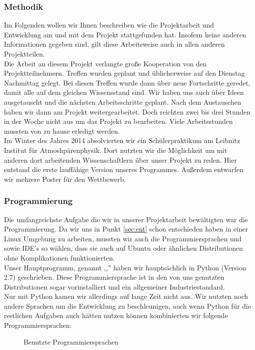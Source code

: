 \subsubsection{Methodik} %
Im Folgenden wollen wir Ihnen beschreiben wie die Projektarbeit und Entwicklung am und mit dem Projekt stattgefunden hat.
Insofern keine anderen Informationen gegeben sind, gilt diese Arbeitsweise auch in allen anderen Projektteilen. \\
Die Arbeit an diesem Projekt verlangte große Kooperation von den Projektteilnehmern.
Treffen wurden geplant und üblicherweise auf den Dienstag Nachmittag gelegt.
Bei diesen Treffen wurde dann über neue Fortschritte geredet, damit alle auf dem gleichen Wissensstand sind.
Wir haben uns auch über Ideen ausgetauscht und die nächsten Arbeitsschritte geplant.
Nach dem Austauschen haben wir dann am Projekt weitergearbeitet.
Doch reichten zwei bis drei Stunden in der Woche nicht aus um das Projekt zu bearbeiten.
Viele Arbeitsstunden mussten von zu hause erledigt werden.\\
Im Winter des Jahres 2014 absolvierten wir ein Schülerpraktikum am Leibnitz Institut für Atmoshpärenphysik. %
Dort nutzten wir die Möglichkeit um mit anderen dort arbeitenden Wissenschaftlern über unser Projekt zu reden.
Hier entstand die erste lauffähige Version unseres Programmes.
Außerdem entwarfen wir mehrere Poster für den \jf Wettbewerb.

\subsubsection{Programmierung}
Die umfangreichste Aufgabe die wir in unserer Projektarbeit bewältigten war die Programmierung.
Da wir uns in Punkt \ref{sec:ent}  schon entschieden haben in einer Linux Umgebung zu arbeiten,
mussten wir auch die Programmiersprachen und sowie IDE's so wählen,
dass sie auch auf Ubuntu oder ähnlichen Distributionen ohne Komplikationen funktionierten.\\
Unser Hauptprogramm, genannt ,,\vs '' haben wir hauptsächlich in Python (Version 2.7) \cite{python27} geschrieben.
Diese Programmiersprache ist in den von uns genutzten Distributionen sogar vorinstalliert und ein allgemeiner Industriestandard.\\
Nur mit Python kamen wir allerdings auf lange Zeit nicht aus.
Wir nutzten noch andere Sprachen um die Entwicklung zu beschleunigen,
auch wenn Python für die restlichen Aufgaben auch hätten nutzen können kombinierten wir folgende Programmiersprachen:
\begin{figure}[H]

\label{fig:pyvi}
\caption{Benutzte Programmiersprachen}
\end{figure}

